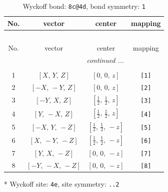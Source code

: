 \documentclass[fleqn,8pt]{jsarticle}
\begin{document}
\renewcommand{\arraystretch}{1.2}
\begin{longtable}{cccc}
\caption{Wyckoff bond: {\tt 8c@4d}, bond symmetry: {\tt 1}}
 \\
 \hline \hline
No. & vector & center & mapping \\ \hline \endfirsthead

\multicolumn{3}{l}{\tablename\ \thetable{}} \\
 \hline \hline
No. & vector & center & mapping \\ \hline \endhead

 \hline \hline
\multicolumn{3}{r}{\footnotesize\it continued ...} \\ \endfoot

 \hline \hline
\multicolumn{3}{r}{} \\ \endlastfoot

1 & $\left[ X,\, Y,\, Z \right]$ & $\left[ 0,\, 0,\, z \right]$ & {\tt [1]} \\ \hline
2 & $\left[ - X,\, - Y,\, Z \right]$ & $\left[ 0,\, 0,\, z \right]$ & {\tt [2]} \\ \hline
3 & $\left[ - Y,\, X,\, Z \right]$ & $\left[ \frac{1}{2},\, \frac{1}{2},\, z \right]$ & {\tt [3]} \\ \hline
4 & $\left[ Y,\, - X,\, Z \right]$ & $\left[ \frac{1}{2},\, \frac{1}{2},\, z \right]$ & {\tt [4]} \\ \hline
5 & $\left[ - X,\, Y,\, - Z \right]$ & $\left[ \frac{1}{2},\, \frac{1}{2},\, - z \right]$ & {\tt [5]} \\ \hline
6 & $\left[ X,\, - Y,\, - Z \right]$ & $\left[ \frac{1}{2},\, \frac{1}{2},\, - z \right]$ & {\tt [6]} \\ \hline
7 & $\left[ Y,\, X,\, - Z \right]$ & $\left[ 0,\, 0,\, - z \right]$ & {\tt [7]} \\ \hline
8 & $\left[ - Y,\, - X,\, - Z \right]$ & $\left[ 0,\, 0,\, - z \right]$ & {\tt [8]} \\
\end{longtable}
* Wyckoff site: {\tt 4e}, site symmetry: {\tt ..2}
\renewcommand{\arraystretch}{1.2}
\end{document}
